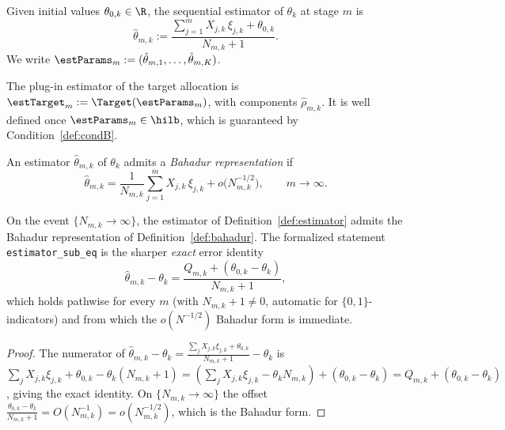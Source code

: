 \begin{definition}\label{def:estimator}
\leanok
{}
Given initial values $\theta_{0,k} \in \R$, the sequential estimator of
$\theta_k$ at stage $m$ is
\[
  \hat{\theta}_{m,k} := \frac{\sum_{j=1}^m X_{j,k}\, \xi_{j,k} + \theta_{0,k}}{N_{m,k} + 1}.
\]
We write $\estParams_m := (\hat{\theta}_{m,1}, \dots, \hat{\theta}_{m,K})$.
\end{definition}

\begin{definition}\label{def:plugin_target}
\leanok
{}
The plug-in estimator of the target allocation is
$\estTarget_m := \Target(\estParams_m)$, with components $\hat{\rho}_{m,k}$.
It is well defined once $\estParams_m \in \hilb$, which is guaranteed by
Condition~\ref{def:condB}.
\end{definition}

\begin{definition}\label{def:bahadur}
An estimator $\hat{\theta}_{m,k}$ of $\theta_k$ admits a \emph{Bahadur
representation} if
\[
  \hat{\theta}_{m,k} = \frac{1}{N_{m,k}}\sum_{j=1}^m X_{j,k}\, \xi_{j,k}
    + o\!\big(N_{m,k}^{-1/2}\big), \qquad m \to \infty.
\]
\end{definition}

\begin{lemma}\label{lem:estimator_bahadur}
\leanok
{}
On the event $\{N_{m,k} \to \infty\}$, the estimator of
Definition~\ref{def:estimator} admits the Bahadur representation of
Definition~\ref{def:bahadur}. The formalized statement \texttt{estimator\_sub\_eq} is the sharper
\emph{exact} error identity
\[
  \hat{\theta}_{m,k} - \theta_k = \frac{Q_{m,k} + (\theta_{0,k} - \theta_k)}{N_{m,k} + 1},
\]
which holds pathwise for every $m$ (with $N_{m,k}+1 \ne 0$, automatic for $\{0,1\}$-indicators) and
from which the $o(N^{-1/2})$ Bahadur form is immediate.
\end{lemma}

\begin{proof}\leanok
The numerator of $\hat{\theta}_{m,k} - \theta_k = \frac{\sum_j X_{j,k}\xi_{j,k} + \theta_{0,k}}{N_{m,k}
+ 1} - \theta_k$ is $\sum_j X_{j,k}\xi_{j,k} + \theta_{0,k} - \theta_k(N_{m,k}+1) = (\sum_j
X_{j,k}\xi_{j,k} - \theta_k N_{m,k}) + (\theta_{0,k} - \theta_k) = Q_{m,k} + (\theta_{0,k} -
\theta_k)$, giving the exact identity. On $\{N_{m,k}\to\infty\}$ the offset
$\frac{\theta_{0,k}-\theta_k}{N_{m,k}+1} = O(N_{m,k}^{-1}) = o(N_{m,k}^{-1/2})$, which is the Bahadur
form.
\end{proof}

